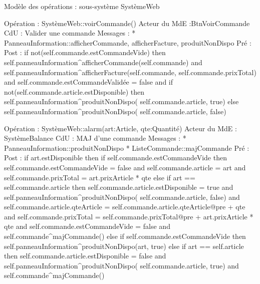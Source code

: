 ﻿Modèle des opérations : sous-système SystèmeWeb






Opération : SystèmeWeb::voirCommande()
Acteur du MdE :BtnVoirCommande
CdU : Valider une commande
Messages : 
* PanneauInformation::{afficherCommande, afficherFacture, produitNonDispo}
Pré :
Post : 
        if not(self.commande.estCommandeVide) then
                self.panneauInformation^afficherCommande(self.commande) 
and
                self.panneauInformation^afficherFacture(self.commande, 
self.commande.prixTotal) 
and
                self.commande.estCommandeValidée = false 
and
                if not(self.commande.article.estDisponible) then
                        self.panneauInformation^produitNonDispo( self.commande.article, true)
                else
                        self.panneauInformation^produitNonDispo( self.commande.article, false)




Opération : SystèmeWeb::alarm(art:Article, qte:Quantité)
Acteur du MdE : SystèmeBalance
CdU : MAJ d’une commande
Messages :
* PanneauInformation::{produitNonDispo} 
* ListeCommande::{majCommande}
Pré :
Post :  
        if art.estDisponible then
                if self.commande.estCommandeVide then
                        self.commande.estCommandeVide = false 
and
self.commande.article = art 
and
self.commande.prixTotal = art.prixArticle * qte
                else
                        if art == self.commande.article then 
                                self.commande.article.estDisponible = true 
and 
                                self.panneauInformation^produitNonDispo( 
self.commande.article, false) 
and
                                self.commande.article.qteArticle = 
self.commande.article.qteArticle@pre + qte
                        and
self.commande.prixTotal = self.commande.prixTotal@pre + 
art.prixArticle * qte
                        and
                        self.commande.estCommandeVide = false
                and
                self.commande^majCommande()
        else
                if self.commande.estCommandeVide then
                        self.panneauInformation^produitNonDispo(art, true)
                else
if art == self.article then 
        self.commande.article.estDisponible = false 
and
                                self.panneauInformation^produitNonDispo(
self.commande.article, true)
                and
                self.commande^majCommande()
        


